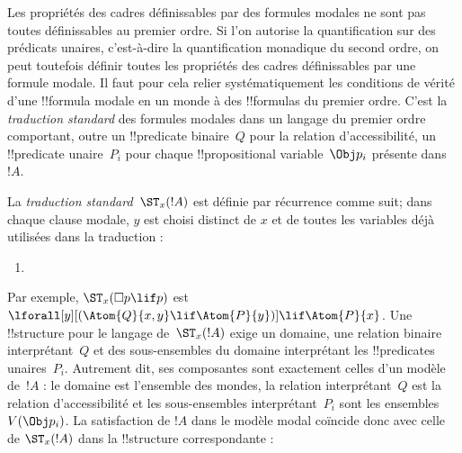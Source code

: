 \documentclass[../../../include/open-logic-section]{subfiles}
\begin{document}


Les propriétés des cadres définissables par des formules modales ne
sont pas toutes définissables au premier ordre. Si l'on autorise la
quantification sur des prédicats unaires, c'est-à-dire la
quantification monadique du second ordre, on peut toutefois définir
toutes les propriétés des cadres définissables par une formule modale.
Il faut pour cela relier systématiquement les conditions de vérité
d'une !!{formula} modale en un monde à des !!{formula}s du premier
ordre. C'est la \emph{traduction standard} des formules modales dans
un langage du premier ordre comportant, outre un !!{predicate}
binaire~$Q$ pour la relation d'accessibilité, un !!{predicate}
unaire~$P_i$ pour chaque !!{propositional variable}~$\Obj p_i$
présente dans~$!A$.

\begin{defn}
  La \emph{traduction standard}~$\ST_x(!A)$ est définie par récurrence
  comme suit; dans chaque clause modale, $y$ est choisi distinct de $x$ et de toutes les variables déjà utilisées dans la traduction :
  \begin{enumerate}
  \item {}
  \end{enumerate}
\end{defn}

Par exemple, $\ST_x(\Box p \lif p)$ est
$\lforall[y][(\Atom{Q}{x,y} \lif \Atom{P}{y})] \lif \Atom{P}{x}$.
Une !!{structure} pour le langage de~$\ST_x(!A)$ exige un domaine,
une relation binaire interprétant~$Q$ et des sous-ensembles du domaine
interprétant les !!{predicate}s unaires~$P_i$. Autrement dit, ses
composantes sont exactement celles d'un modèle de~$!A$ : le domaine
est l'ensemble des mondes, la relation interprétant~$Q$ est la
relation d'accessibilité et les sous-ensembles interprétant~$P_i$
sont les ensembles~$V(\Obj p_i)$. La satisfaction de $!A$ dans le
modèle modal coïncide donc avec celle de $\ST_x(!A)$ dans la
!!{structure} correspondante :
\end{document}
